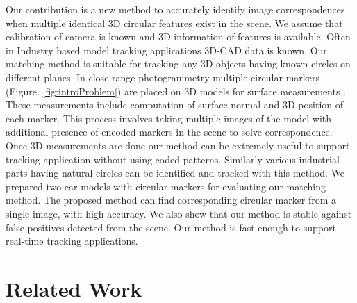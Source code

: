 \documentclass{bmvc2k}
\begin{document}
Our contribution is a new method to accurately identify image correspondences when multiple identical 3D circular features exist in the scene. We assume that calibration of camera is known and 3D information of features is available. 
Often in Industry based model tracking applications 3D-CAD data is known. Our matching method is suitable for tracking any 3D objects having known circles on different planes. In close range photogrammetry multiple circular markers (Figure. \ref{fig:introProblem}) are placed on 3D models for surface measurements \cite{luhmann_close_2006}. 
These measurements include computation of surface normal and 3D position of each marker. 
This process involves taking multiple images of the model with additional presence of encoded markers in the scene to solve correspondence. 
Once 3D measurements are done our method can be extremely useful to support tracking application without using coded patterns. Similarly various industrial parts having natural circles can be identified and tracked with this method. 
We prepared two car models with circular markers for evaluating our matching method. The proposed method can find corresponding circular marker from a single image, with high accuracy. We also show that our method is stable against false positives detected from the scene. Our method is fast enough to support real-time tracking applications. 

\section{Related Work}
\end{document}

